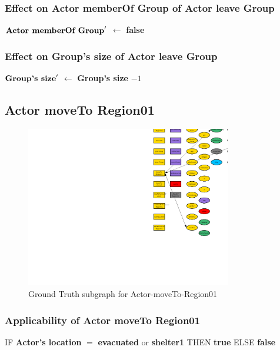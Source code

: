 \documentclass{article}%
\begin{document}
%
\subsubsection{Effect on Actor memberOf Group of Actor leave Group}%
\label{ssubsec:Effect on Actor memberOf Group of Actor leave Group}%
\begin{flushleft}%
$\mbox{\textbf{Actor memberOf Group}} '$%
$\leftarrow$%
\textbf{false}%
\end{flushleft}

%
\subsubsection{Effect on Group's size of Actor leave Group}%
\label{ssubsec:Effect on Group's size of Actor leave Group}%
\begin{flushleft}%
$\mbox{\textbf{Group's size}} '$%
$\leftarrow$%
\textbf{Group's size}%
${-}1$%
\end{flushleft}

%
\subsection{Actor moveTo Region01}%
\label{subsec:Actor moveTo Region01}%


\begin{figure}[ht]%
\centering%
\includegraphics[width=0.8\textwidth]{images/Actor-moveTo-Region01.png}%
\caption{Ground Truth subgraph for Actor{-}moveTo{-}Region01}%
\end{figure}

%
\subsubsection{Applicability of Actor moveTo Region01}%
\label{ssubsec:Applicability of Actor moveTo Region01}%
\begin{flushleft}%
IF %
\textbf{Actor's location}%
$=$%
\textbf{evacuated}%
 or %
\textbf{shelter1}%
\linebreak%
\hspace*{2em}%
THEN %
\textbf{true}%
\linebreak%
\hspace*{2em}%
ELSE %
\textbf{false}%
\end{flushleft}
\end{document}
